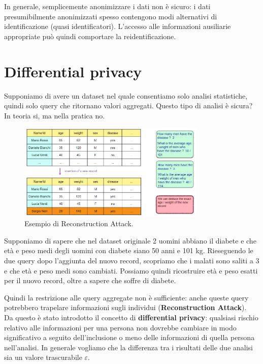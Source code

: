 \noindent In generale, semplicemente anonimizzare i dati non è sicuro: i dati presumibilmente anonimizzati spesso contengono modi alternativi di identificazione (quasi identificatori). L'accesso alle informazioni ausiliarie appropriate può quindi comportare la reidentificazione.

\section{Differential privacy}
Supponiamo di avere un dataset nel quale consentiamo solo analisi statistiche, quindi solo query che ritornano valori aggregati. Questo tipo di analisi è sicura? In teoria si, ma nella pratica no. 

\begin{figure}
    \centering
    \includegraphics[width=0.8\textwidth]{images/14-8.png}
    \caption{Esempio di Reconstruction Attack.}
    \label{fig:14-8}
\end{figure}

\noindent Supponiamo di sapere che nel dataset originale 2 uomini abbiano il diabete e che età e peso medi degli uomini con diabete siano 50 anni e 101 kg. Rieseguendo le due query dopo l'aggiunta del nuovo record, scopriamo che i malati sono saliti a 3 e che età e peso medi sono cambiati. Possiamo quindi ricostruire età e peso esatti per il nuovo record, oltre a sapere che soffre di diabete.

Quindi la restrizione alle query aggregate non è sufficiente: anche queste query potrebbero trapelare informazioni sugli individui (\textbf{Reconstruction Attack}).
\\

\noindent Da questo è stato introdotto il concetto di \textbf{differential privacy}: qualsiasi rischio relativo alle informazioni per una persona non dovrebbe cambiare in modo significativo a seguito dell'inclusione o meno delle informazioni di quella persona nell'analisi. In generale vogliamo che la differenza tra i risultati delle due analisi sia un valore trascurabile $\varepsilon$.
\\


